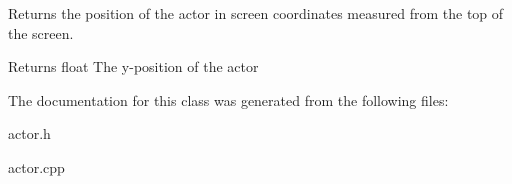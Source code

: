 Returns the position of the actor in screen coordinates measured from the top of the screen. 

\begin{DoxyReturn}{Returns}
float The y-\/position of the actor 
\end{DoxyReturn}


The documentation for this class was generated from the following files\+:\begin{DoxyCompactItemize}
\item 
actor.\+h\item 
actor.\+cpp\end{DoxyCompactItemize}
